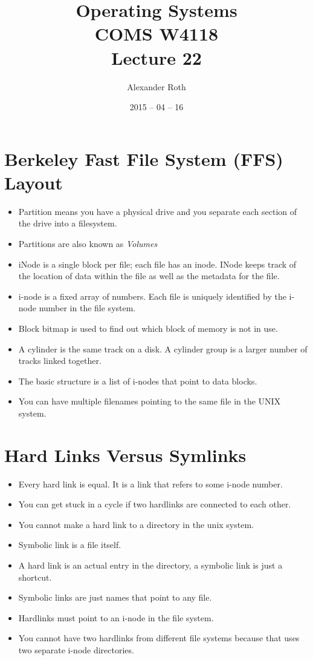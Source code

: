 \documentclass[]{article}
\begin{document}
\newcommand{\code}{\texttt}
\newtheorem{thm}{Theorem}
\title{Operating Systems \\ COMS W4118 \\ Lecture 22}
\author{Alexander Roth}
\date{2015 -- 04 -- 16}
\maketitle

\section{Berkeley Fast File System (FFS) Layout}
\begin{itemize}
\item Partition means you have a physical drive and you separate each section of
the drive into a filesystem.
\item Partitions are also known as \emph{Volumes}
\item iNode is a single block per file; each file has an inode. INode keeps
track of the location of data within the file as well as the metadata for the
file.
\item i-node is a fixed array of numbers. Each file is uniquely identified by
the i-node number in the file system.
\item Block bitmap is used to find out which block of memory is not in use.
\item A cylinder is the same track on a disk. A cylinder group is a larger
number of tracks linked together.
\item The basic structure is a list of i-nodes that point to data blocks.
\item You can have multiple filenames pointing to the same file in the UNIX
system.
\end{itemize}

\section{Hard Links Versus Symlinks}
\begin{itemize}
\item Every hard link is equal. It is a link that refers to some i-node number.
\item You can get stuck in a cycle if two hardlinks are connected to each other.
\item You cannot make a hard link to a directory in the unix system.
\item Symbolic link is a file itself.
\item A hard link is an actual entry in the directory, a symbolic link is just a
shortcut.
\item Symbolic links are just names that point to any file.
\item Hardlinks must point to an i-node in the file system.
\item You cannot have two hardlinks from different file systems because that
uses two separate i-node directories.
\end{itemize}
\end{document}
